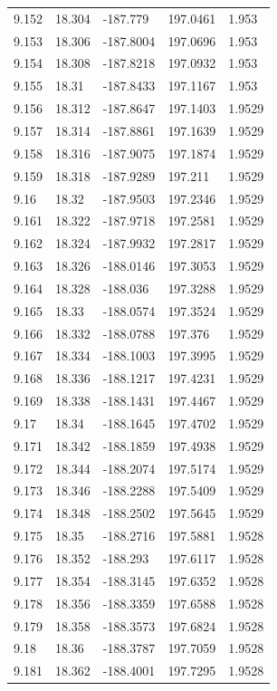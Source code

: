 \begin{tabular}{lllll}
9.152 & 18.304 & -187.779 & 197.0461 & 1.953 \\
9.153 & 18.306 & -187.8004 & 197.0696 & 1.953 \\
9.154 & 18.308 & -187.8218 & 197.0932 & 1.953 \\
9.155 & 18.31 & -187.8433 & 197.1167 & 1.953 \\
9.156 & 18.312 & -187.8647 & 197.1403 & 1.9529 \\
9.157 & 18.314 & -187.8861 & 197.1639 & 1.9529 \\
9.158 & 18.316 & -187.9075 & 197.1874 & 1.9529 \\
9.159 & 18.318 & -187.9289 & 197.211 & 1.9529 \\
9.16 & 18.32 & -187.9503 & 197.2346 & 1.9529 \\
9.161 & 18.322 & -187.9718 & 197.2581 & 1.9529 \\
9.162 & 18.324 & -187.9932 & 197.2817 & 1.9529 \\
9.163 & 18.326 & -188.0146 & 197.3053 & 1.9529 \\
9.164 & 18.328 & -188.036 & 197.3288 & 1.9529 \\
9.165 & 18.33 & -188.0574 & 197.3524 & 1.9529 \\
9.166 & 18.332 & -188.0788 & 197.376 & 1.9529 \\
9.167 & 18.334 & -188.1003 & 197.3995 & 1.9529 \\
9.168 & 18.336 & -188.1217 & 197.4231 & 1.9529 \\
9.169 & 18.338 & -188.1431 & 197.4467 & 1.9529 \\
9.17 & 18.34 & -188.1645 & 197.4702 & 1.9529 \\
9.171 & 18.342 & -188.1859 & 197.4938 & 1.9529 \\
9.172 & 18.344 & -188.2074 & 197.5174 & 1.9529 \\
9.173 & 18.346 & -188.2288 & 197.5409 & 1.9529 \\
9.174 & 18.348 & -188.2502 & 197.5645 & 1.9529 \\
9.175 & 18.35 & -188.2716 & 197.5881 & 1.9528 \\
9.176 & 18.352 & -188.293 & 197.6117 & 1.9528 \\
9.177 & 18.354 & -188.3145 & 197.6352 & 1.9528 \\
9.178 & 18.356 & -188.3359 & 197.6588 & 1.9528 \\
9.179 & 18.358 & -188.3573 & 197.6824 & 1.9528 \\
9.18 & 18.36 & -188.3787 & 197.7059 & 1.9528 \\
9.181 & 18.362 & -188.4001 & 197.7295 & 1.9528 \\

\end{tabular}
